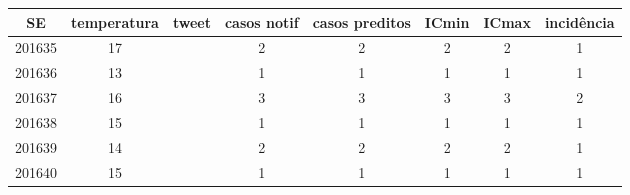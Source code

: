 \begin{tabular}{c|ccccccc}
  \hline
SE & temperatura & tweet & casos notif & casos preditos & ICmin & ICmax & incidência \\ 
  \hline
201635 & 17 &  & 2 & 2 & 2 & 2 & 1 \\ 
  201636 & 13 &  & 1 & 1 & 1 & 1 & 1 \\ 
  201637 & 16 &  & 3 & 3 & 3 & 3 & 2 \\ 
  201638 & 15 &  & 1 & 1 & 1 & 1 & 1 \\ 
  201639 & 14 &  & 2 & 2 & 2 & 2 & 1 \\ 
  201640 & 15 &  & 1 & 1 & 1 & 1 & 1 \\ 
   \hline
\end{tabular}
